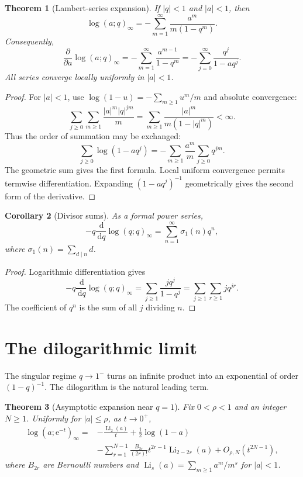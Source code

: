 \documentclass[11pt,oneside,openany]{book}
\newtheorem{theorem}{Theorem}[chapter]
\newtheorem{corollary}[theorem]{Corollary}
\theoremstyle{definition}
\theoremstyle{remark}
\newcommand{\Li}{\operatorname{Li}}
\newcommand{\e}{\mathrm e}
\newcommand{\dd}{\,\mathrm d}
\newcommand{\abs}[1]{\lvert #1\rvert}
\begin{document}
\begin{theorem}[Lambert-series expansion]\label{thm:lambert-log}
If $\abs q<1$ and $\abs a<1$, then
\[
 \log(a;q)_\infty
 =-\sum_{m=1}^{\infty}\frac{a^m}{m(1-q^m)}.
\]
Consequently,
\[
 \frac{\partial}{\partial a}\log(a;q)_\infty
 =-\sum_{m=1}^{\infty}\frac{a^{m-1}}{1-q^m}
 =-\sum_{j=0}^{\infty}\frac{q^j}{1-aq^j}.
\]
All series converge locally uniformly in $\abs a<1$.
\end{theorem}

\begin{proof}
For $\abs a<1$, use $\log(1-u)=-\sum_{m\ge1}u^m/m$ and absolute convergence:
\[
 \sum_{j\ge0}\sum_{m\ge1}\frac{\abs a^m\abs q^{jm}}{m}
 =\sum_{m\ge1}\frac{\abs a^m}{m(1-\abs q^m)}<\infty.
\]
Thus the order of summation may be exchanged:
\[
 \sum_{j\ge0}\log(1-aq^j)
 =-\sum_{m\ge1}\frac{a^m}{m}\sum_{j\ge0}q^{jm}.
\]
The geometric sum gives the first formula.  Local uniform convergence permits termwise differentiation.  Expanding $(1-aq^j)^{-1}$ geometrically gives the second form of the derivative.
\end{proof}

\begin{corollary}[Divisor sums]\label{cor:divisor-sum}
As a formal power series,
\[
 -q\frac{\dd}{\dd q}\log(q;q)_\infty
 =\sum_{n=1}^{\infty}\sigma_1(n)q^n,
\]
where $\sigma_1(n)=\sum_{d\mid n}d$.
\end{corollary}

\begin{proof}
Logarithmic differentiation gives
\[
 -q\frac{\dd}{\dd q}\log(q;q)_\infty
 =\sum_{j\ge1}\frac{j q^j}{1-q^j}
 =\sum_{j\ge1}\sum_{r\ge1}j q^{jr}.
\]
The coefficient of $q^n$ is the sum of all $j$ dividing $n$.
\end{proof}

\section{The dilogarithmic limit}

The singular regime $q\to1^-$ turns an infinite product into an exponential of order $(1-q)^{-1}$.  The dilogarithm is the natural leading term.

\begin{theorem}[Asymptotic expansion near $q=1$]\label{thm:poch-dilog}
Fix $0<\rho<1$ and an integer $N\ge1$.  Uniformly for $\abs a\le\rho$, as $t\to0^+$,
\[
\begin{aligned}
 \log(a;\e^{-t})_\infty
 ={}&-\frac{\Li_2(a)}{t}+\frac12\log(1-a)\\
 &-\sum_{r=1}^{N-1}\frac{B_{2r}}{(2r)!}
 t^{2r-1}\Li_{2-2r}(a)+O_{\rho,N}(t^{2N-1}),
\end{aligned}
\]
where $B_{2r}$ are Bernoulli numbers and
\(
 \Li_s(a)=\sum_{m\ge1}a^m/m^s
\)
for $\abs a<1$.
\end{theorem}
\end{document}
